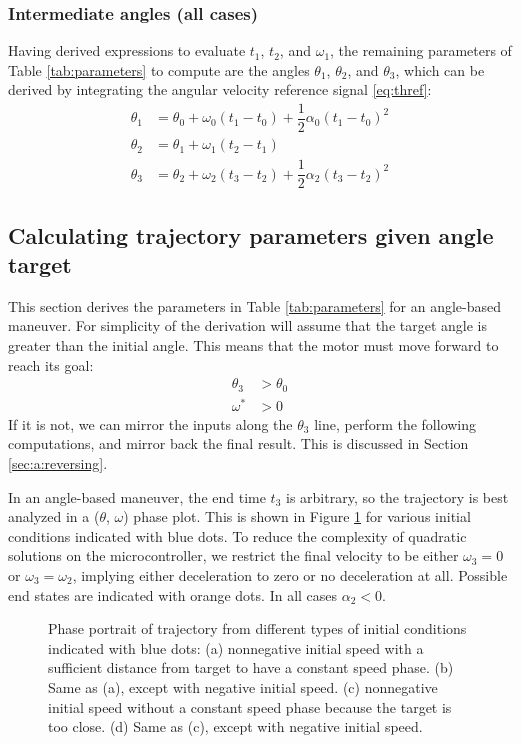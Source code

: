 \documentclass[12pt, a4paper]
{article}
\providecommand{\w}{\omega}
\providecommand{\wt}{\w^*}
\renewcommand{\th}{\theta}
\renewcommand{\a}{\alpha}
\begin{document}
\subsubsection{Intermediate angles (all cases)}

Having derived expressions to evaluate $t_1$, $t_2$, and $\w_1$, the remaining
parameters of Table \ref{tab:parameters} to compute are the angles
$\th_1$, $\th_2$, and $\th_3$, which can be derived by integrating the
angular velocity reference signal \eqref{eq:thref}:
\begin{align}
    \label{eq:t:anglepar1}
    \th_1  &= \th_0  + \w_0(t_1-t_0)+\dfrac{1}{2}\a_0(t_1-t_0)^2\\
    \label{eq:t:anglepar2}
    \th_2&=\th_1+ \w_1(t_2-t_1)\\
    \label{eq:t:anglepar3}
    \th_3  &=\th_2+ \w_2(t_3-t_2)+\dfrac{1}{2}\a_2(t_3-t_2)^2    
\end{align}
%

\subsection{Calculating trajectory parameters given angle target}
\label{sec:anglebasedref}
This section derives the parameters in Table \ref{tab:parameters} for an
angle-based maneuver. For simplicity of the derivation will assume that
the target angle  is greater than the initial angle. This
means that the motor must move forward to reach its goal:
%
\begin{align}
    \label{eq:a:forwardmaneuver}
    \th_3 &> \th_0\\
    \wt &> 0
\end{align}
%
If it is not, we can mirror the inputs along the $\th_3$ line, perform the
following computations, and mirror back the final result. This is discussed
in Section \ref{sec:a:reversing}.

In an angle-based maneuver, the end time $t_3$ is arbitrary, so the trajectory
is best analyzed in a ($\th$, $\w$) phase plot. This is shown in Figure
\ref{fig:positions} for various initial conditions indicated with blue dots.
To reduce the complexity of quadratic solutions on the microcontroller, we
restrict the final velocity to be either $\w_3=0$ or $\w_3=\w_2$, implying
either deceleration to zero or no deceleration at all. Possible end states are
indicated with orange dots. In all cases $\a_2 < 0$.


\begin{figure}[H]
    \centering
    
    \caption{
        Phase portrait of trajectory from different types of initial conditions
        indicated with blue dots:
        (a) nonnegative initial speed with a
        sufficient distance from target to have a constant speed phase.
        (b) Same as (a), except with negative initial speed.
        (c) nonnegative initial speed without a constant speed phase because
        the target is too close.
        (d) Same as (c), except with negative initial speed.
        \label{fig:positions}}
\end{figure}
\end{document}
